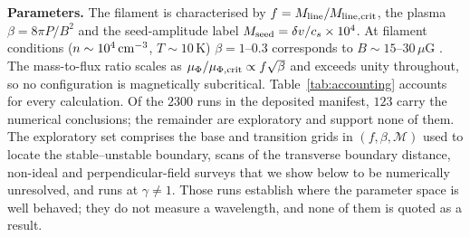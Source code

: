 \documentclass[usenatbib,twoside,twocolumn]{mnras}
\begin{document}
\smallskip\noindent\textbf{Parameters.} The filament is characterised by $f=M_{\rm line}/M_{\rm line,crit}$, the plasma $\beta=8\pi P/B^2$ and the seed-amplitude label $M_{\rm seed}=\delta v/c_s\times10^{4}$. At filament conditions ($n\sim10^4\,{\rm cm^{-3}}$, $T\sim10$\,K) $\beta=1$--$0.3$ corresponds to $B\sim15$--$30\,\mu$G \citep{Crutcher2012}. The mass-to-flux ratio scales as $\mu_\Phi/\mu_{\Phi,\rm crit}\propto f\sqrt{\beta}$ and exceeds unity throughout, so no configuration is magnetically subcritical. Table~\ref{tab:accounting} accounts for every calculation. Of the $2300$ runs in the deposited manifest, $123$ carry the numerical conclusions; the remainder are exploratory and support none of them. The exploratory set comprises the base and transition grids in $(f,\beta,\mathcal{M})$ used to locate the stable--unstable boundary, scans of the transverse boundary distance, non-ideal and perpendicular-field surveys that we show below to be numerically unresolved, and runs at $\gamma\neq1$. Those runs establish where the parameter space is well behaved; they do not measure a wavelength, and none of them is quoted as a result.
\end{document}
